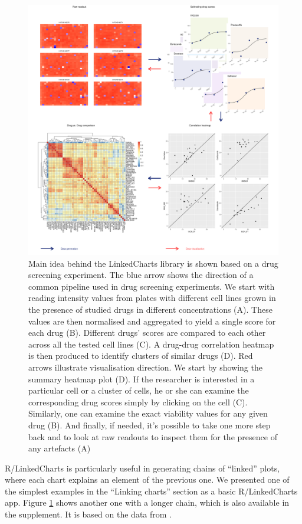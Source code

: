 \documentclass[twocolumn,10pt]{article}
\begin{document}
\begin{figure}
  \includegraphics[width=\textwidth]{FigC/figC.png}
  \caption{Main idea behind the LinkedCharts library is shown based on a drug screening experiment. The blue arrow shows the direction of a common pipeline used in drug screening experiments. We start with reading intensity values from plates with different cell lines grown in the presence of studied drugs in different concentrations (A). These values are then normalised and aggregated to yield a single score for each drug (B). Different drugs' scores are compared to each other across all the tested cell lines (C). A drug-drug correlation heatmap is then produced to identify clusters of similar drugs (D). Red arrows illustrate visualisation direction. We start by showing the summary heatmap plot (D). If the researcher is interested in a particular cell or a cluster of cells, he or she can examine the corresponding drug scores simply by clicking on the cell (C). Similarly, one can examine the exact viability values for any given drug (B). And finally, if needed, it's possible to take one more step back and to look at raw readouts to inspect them for the presence of any artefacts (A)}
  \label{FigC}
\end{figure}

R/LinkedCharts is particularly useful in generating chains of ``linked'' plots, where each chart explains an element of the previous one. We presented one of the simplest examples in the ``Linking charts'' section as a basic R/LinkedCharts app. Figure \ref{FigC} shows another one with a longer chain, which is also available in the supplement. It is based on the data from \citet{he_2018}.
\end{document}
